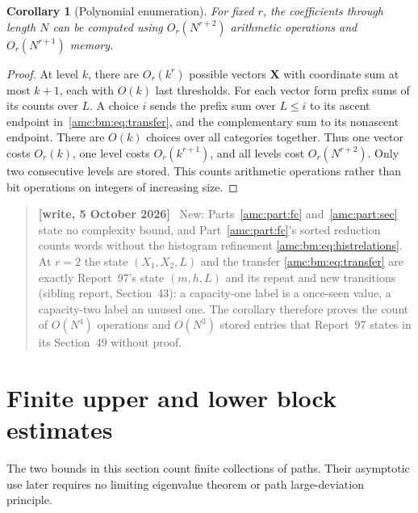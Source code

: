 \documentclass[11pt,letterpaper]{article}
\newtheorem{corollary}[theorem]{Corollary}
\theoremstyle{remark}\newtheorem{remark}[theorem]{Remark}
\newcommand{\bX}{\boldsymbol X}
\newenvironment{writenotedated}[1]{\par\smallskip\begin{quote}\small\textbf{[write, #1]}\ }{\end{quote}\smallskip}
\begin{document}
\begin{corollary}[Polynomial enumeration]\label{amc:bm:cor:algorithm}
For fixed $r$, the coefficients through length $N$ can be computed using $O_r(N^{r+2})$ arithmetic operations and $O_r(N^{r+1})$ memory.
\end{corollary}
\begin{proof}
At level $k$, there are $O_r(k^r)$ possible vectors $\bX$ with coordinate sum at most $k+1$, each with $O(k)$ last thresholds. For each vector form prefix sums of its counts over $L$. A choice $i$ sends the prefix sum over $L\le i$ to its ascent endpoint in~\eqref{amc:bm:eq:transfer}, and the complementary sum to its nonascent endpoint. There are $O(k)$ choices over all categories together. Thus one vector costs $O_r(k)$, one level costs $O_r(k^{r+1})$, and all levels cost $O_r(N^{r+2})$. Only two consecutive levels are stored. This counts arithmetic operations rather than bit operations on integers of increasing size.
\end{proof}

\begin{writenotedated}{5 October 2026}
New: Parts~\ref{amc:part:fc} and~\ref{amc:part:sec} state no complexity bound, and Part~\ref{amc:part:fc}'s sorted reduction counts words without the histogram refinement \eqref{amc:bm:eq:histrelations}. At $r=2$ the state $(X_1,X_2,L)$ and the transfer \eqref{amc:bm:eq:transfer} are exactly Report~97's state $(m,h,L)$ and its repeat and new transitions (sibling report, Section~43): a capacity-one label is a once-seen value, a capacity-two label an unused one. The corollary therefore proves the count of $O(N^4)$ operations and $O(N^3)$ stored entries that Report~97 states in its Section~49 without proof.
\end{writenotedated}

\section{Finite upper and lower block estimates}\label{amc:bm:sec:blocks}
The two bounds in this section count finite collections of paths. Their asymptotic use later requires no limiting eigenvalue theorem or path large-deviation principle.
\end{document}
